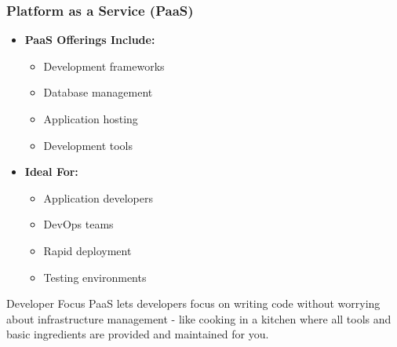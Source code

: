 \documentclass{beamer}
\begin{document}
\begin{frame}
    \frametitle{Platform as a Service (PaaS)}
    
    \begin{itemize}
        \item \textbf{PaaS Offerings Include:}
        \begin{itemize}
            \item Development frameworks
            \item Database management
            \item Application hosting
            \item Development tools
        \end{itemize}
        
        \item \textbf{Ideal For:}
        \begin{itemize}
            \item Application developers
            \item DevOps teams
            \item Rapid deployment
            \item Testing environments
        \end{itemize}
    \end{itemize}
    
    \begin{alertblock}{Developer Focus}
        PaaS lets developers focus on writing code without worrying about infrastructure management - like cooking in a kitchen where all tools and basic ingredients are provided and maintained for you.
    \end{alertblock}
\end{frame}
\end{document}
